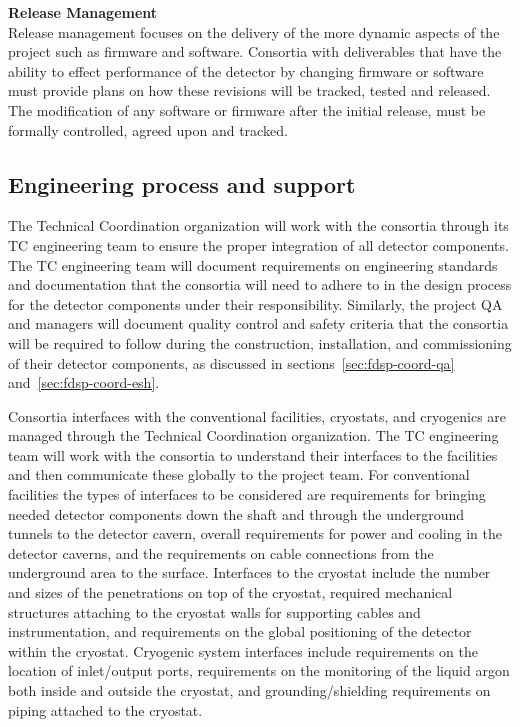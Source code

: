 {\bf Release Management}\\
Release management focuses on the delivery of the more dynamic aspects
of the project such as firmware and software.  Consortia with
deliverables that have the ability to effect performance of the
detector by changing firmware or software must provide plans on how
these revisions will be tracked, tested and released.  The
modification of any software or firmware after the initial release,
must be formally controlled, agreed upon and tracked.


\subsection{Engineering process and support}
\label{sec:fdsp-coord-integ-engr-proc}
 

The  Technical Coordination organization will work with
the consortia through its TC engineering team to ensure the proper
integration of all detector components.  The TC engineering team will
document requirements on engineering standards and documentation that
the consortia will need to adhere to in the design process for the
detector components under their responsibility.  Similarly, the
project QA and  managers will document quality control and safety
criteria that the consortia will be required to follow during the
construction, installation, and commissioning of their detector
components, as discussed in sections~\ref{sec:fdsp-coord-qa}
and~\ref{sec:fdsp-coord-esh}.


Consortia interfaces with the conventional facilities, cryostats, and
cryogenics are managed through the  Technical Coordination
organization.  The TC engineering team will work with the
consortia to understand their interfaces to the facilities and then
communicate these globally to the  project team.  For conventional
facilities the types of interfaces to be considered are requirements
for bringing needed detector components down the shaft and through the
underground tunnels to the detector cavern, overall requirements for
power and cooling in the detector caverns, and the requirements on
cable connections from the underground area to the surface.
Interfaces to the cryostat include the number and sizes of the
penetrations on top of the cryostat, required mechanical structures
attaching to the cryostat walls for supporting cables and
instrumentation, and requirements on the global positioning of the
detector within the cryostat.  Cryogenic system interfaces include
requirements on the location of inlet/output ports, requirements on
the monitoring of the liquid argon both inside and outside the
cryostat, and grounding/shielding requirements on piping attached to
the cryostat.

